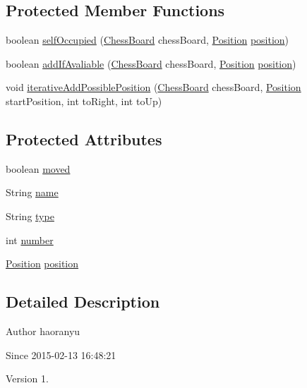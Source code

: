 \subsection*{Protected Member Functions}
\begin{DoxyCompactItemize}
\item 
boolean \hyperlink{classmodel_chess_pieces_1_1_chess_piece_a8045974b8d8f1e88722cd54b050774c5}{self\+Occupied} (\hyperlink{classmodel_core_1_1_chess_board}{Chess\+Board} chess\+Board, \hyperlink{classmodel_core_1_1_position}{Position} \hyperlink{classmodel_chess_pieces_1_1_chess_piece_a3d4362d5b28f6edb14161196d9c6807d}{position})
\item 
boolean \hyperlink{classmodel_chess_pieces_1_1_chess_piece_a247db1a354f7792b0a79b8128629a1c5}{add\+If\+Avaliable} (\hyperlink{classmodel_core_1_1_chess_board}{Chess\+Board} chess\+Board, \hyperlink{classmodel_core_1_1_position}{Position} \hyperlink{classmodel_chess_pieces_1_1_chess_piece_a3d4362d5b28f6edb14161196d9c6807d}{position})
\item 
void \hyperlink{classmodel_chess_pieces_1_1_chess_piece_a3768e0328f7eec372daeed33a58644ba}{iterative\+Add\+Possible\+Position} (\hyperlink{classmodel_core_1_1_chess_board}{Chess\+Board} chess\+Board, \hyperlink{classmodel_core_1_1_position}{Position} start\+Position, int to\+Right, int to\+Up)
\end{DoxyCompactItemize}
\subsection*{Protected Attributes}
\begin{DoxyCompactItemize}
\item 
boolean \hyperlink{classmodel_chess_pieces_1_1_chess_piece_a5bc0722badda5dc066b6a73476fc933c}{moved}
\item 
String \hyperlink{classmodel_chess_pieces_1_1_chess_piece_a03d2fb76fbbff0dab72d00f2173a69ff}{name}
\item 
String \hyperlink{classmodel_chess_pieces_1_1_chess_piece_a195487ca88c197af7c1604247be31db2}{type}
\item 
int \hyperlink{classmodel_chess_pieces_1_1_chess_piece_a979e63b99128333883acedc38d25dc87}{number}
\item 
\hyperlink{classmodel_core_1_1_position}{Position} \hyperlink{classmodel_chess_pieces_1_1_chess_piece_a3d4362d5b28f6edb14161196d9c6807d}{position}
\end{DoxyCompactItemize}


\subsection{Detailed Description}
\begin{DoxyAuthor}{Author}
haoranyu 
\end{DoxyAuthor}
\begin{DoxySince}{Since}
2015-\/02-\/13 16\+:48\+:21 
\end{DoxySince}
\begin{DoxyVersion}{Version}
1. 
\end{DoxyVersion}


